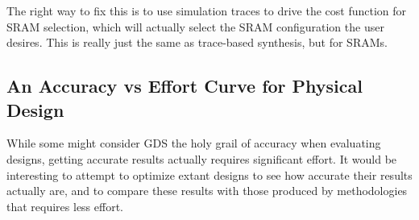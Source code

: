 \documentclass{article}
\begin{document}
The right way to fix this is to use simulation traces to drive the cost
function for SRAM selection, which will actually select the SRAM configuration
the user desires.  This is really just the same as trace-based synthesis, but
for SRAMs.

\subsection{An Accuracy vs Effort Curve for Physical Design}

While some might consider GDS the holy grail of accuracy when evaluating
designs, getting accurate results actually requires significant effort.  It
would be interesting to attempt to optimize extant designs to see how accurate
their results actually are, and to compare these results with those produced by
methodologies that requires less effort.
\end{document}
